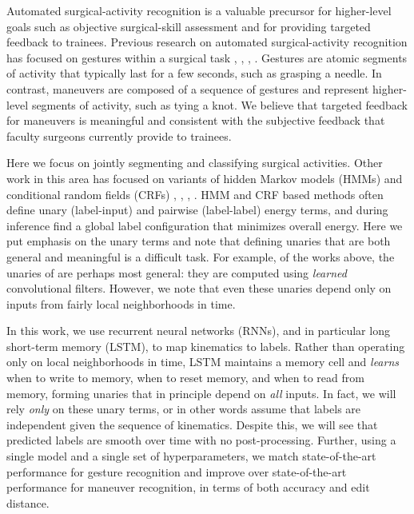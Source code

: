\documentclass{llncs}
\begin{document}
Automated surgical-activity recognition is a valuable precursor for higher-level goals such as objective surgical-skill assessment and for providing targeted feedback to trainees. Previous research on automated surgical-activity recognition has focused on gestures within a surgical task \cite{lea2016learning}, \cite{tao2013surgical}, \cite{lea2015improved}, \cite{sefati2015learning}. Gestures are atomic segments of activity that typically last for a few seconds, such as grasping a needle. In contrast, maneuvers are composed of a sequence of gestures and represent higher-level segments of activity, such as tying a knot. We believe that targeted feedback for maneuvers is meaningful and consistent with the subjective feedback that faculty surgeons currently provide to trainees.

Here we focus on jointly segmenting and classifying surgical activities. Other work in this area has focused on variants of hidden Markov models (HMMs) and conditional random fields (CRFs) \cite{lea2016learning}, \cite{tao2013surgical}, \cite{lea2015improved}, \cite{sefati2015learning}. HMM and CRF based methods often define unary (label-input) and pairwise (label-label) energy terms, and during inference find a global label configuration that minimizes overall energy. Here we put emphasis on the unary terms and note that defining unaries that are both general and meaningful is a difficult task. For example, of the works above, the unaries of \cite{lea2016learning} are perhaps most general: they are computed using \emph{learned} convolutional filters. However, we note that even these unaries depend only on inputs from fairly local neighborhoods in time.

In this work, we use recurrent neural networks (RNNs), and in particular long short-term memory (LSTM), to map kinematics to labels. Rather than operating only on local neighborhoods in time, LSTM maintains a memory cell and \emph{learns} when to write to memory, when to reset memory, and when to read from memory, forming unaries that in principle depend on \emph{all} inputs. In fact, we will rely \emph{only} on these unary terms, or in other words assume that labels are independent given the sequence of kinematics. Despite this, we will see that predicted labels are smooth over time with no post-processing. Further, using a single model and a single set of hyperparameters, we match state-of-the-art performance for gesture recognition and improve over state-of-the-art performance for maneuver recognition, in terms of both accuracy and edit distance.
\end{document}
